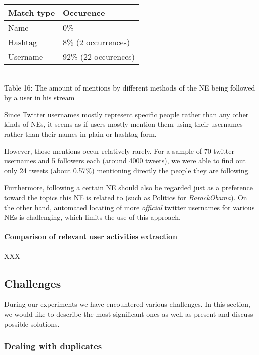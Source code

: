 \begin{center}
  \begin{tabular}{ | p{3cm}| p{3.5cm} | } \hline
    Match type & Occurence \\ \hline
    Name & 0\% \\ \hline
    Hashtag & 8\% (2 occurrences) \\ \hline
    Username & 92\% (22 occurences) \\ \hline
  \end{tabular} \\
  Table 16: The amount of mentions by different methods of the NE being followed by a user in his stream \\
\end{center}

Since Twitter usernames mostly represent specific people rather than any other kinds of NEs, it seems as if users mostly
mention them using their usernames rather than their names in plain or hashtag form.

However, those mentions occur relatively rarely. For a sample of 70 twitter usernames and 5 followers each
(around 4000 tweets), we were able to find out only 24 tweets (about 0.57\%) mentioning directly the people they are following.

Furthermore, following a certain NE should also be regarded just as a preference toward the topics this NE is related to (such as Politics for \textit{BarackObama}). On the other hand, automated locating of more \textit{official} twitter usernames for various NEs is challenging, which
limits the use of this approach.

\paragraph{Comparison of relevant user activities extraction}

XXX

\subsection{Challenges}

During our experiments we have encountered various challenges. In this section, we would like to describe
the most significant ones as well as present and discuss possible solutions.

\subsubsection{Dealing with duplicates}

